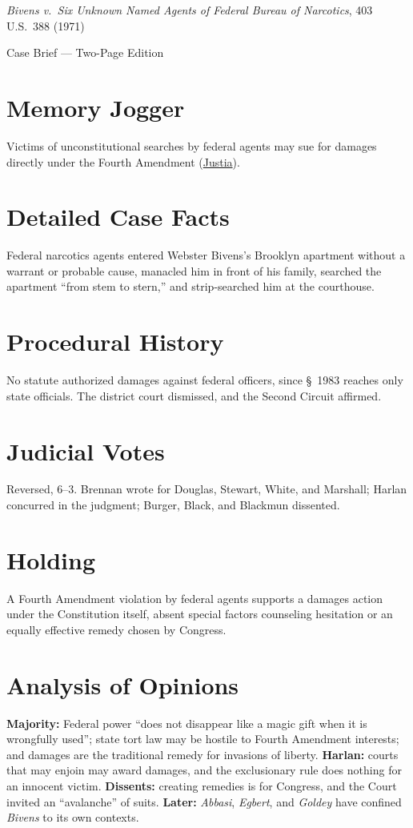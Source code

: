 \documentclass[12pt]{article}
\begin{document}
\begin{center}
{\LARGE \textit{Bivens v.\ Six Unknown Named Agents of Federal Bureau of Narcotics}, 403 U.S.\ 388 (1971)\par}
\vspace{0.5em}
{\large Case Brief --- Two-Page Edition\par}
\end{center}

\section{Memory Jogger}
Victims of unconstitutional searches by federal agents may sue for damages directly under the Fourth Amendment (\href{https://supreme.justia.com/cases/federal/us/403/388/}{Justia}).

\section{Detailed Case Facts}
Federal narcotics agents entered Webster Bivens's Brooklyn apartment without a warrant or probable cause, manacled him in front of his family, searched the apartment ``from stem to stern,'' and strip-searched him at the courthouse.

\section{Procedural History}
No statute authorized damages against federal officers, since \S~1983 reaches only state officials. The district court dismissed, and the Second Circuit affirmed.

\section{Judicial Votes}
Reversed, 6--3. Brennan wrote for Douglas, Stewart, White, and Marshall; Harlan concurred in the judgment; Burger, Black, and Blackmun dissented.

\section{Holding}
A Fourth Amendment violation by federal agents supports a damages action under the Constitution itself, absent special factors counseling hesitation or an equally effective remedy chosen by Congress.

\section{Analysis of Opinions}
\textbf{Majority:} Federal power ``does not disappear like a magic gift when it is wrongfully used''; state tort law may be hostile to Fourth Amendment interests; and damages are the traditional remedy for invasions of liberty. \textbf{Harlan:} courts that may enjoin may award damages, and the exclusionary rule does nothing for an innocent victim. \textbf{Dissents:} creating remedies is for Congress, and the Court invited an ``avalanche'' of suits. \textbf{Later:} \textit{Abbasi}, \textit{Egbert}, and \textit{Goldey} have confined \textit{Bivens} to its own contexts.
\end{document}
